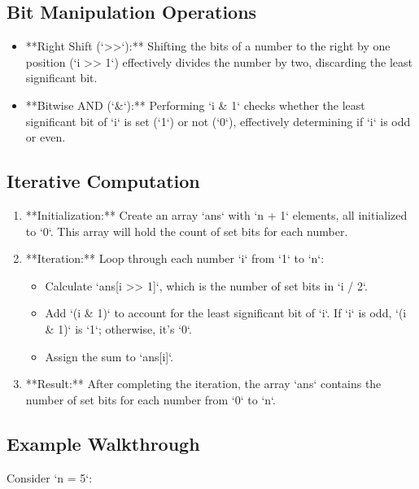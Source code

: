 \subsection*{Bit Manipulation Operations}

\begin{itemize}
    \item **Right Shift (`>>`):** Shifting the bits of a number to the right by one position (`i >> 1`) effectively divides the number by two, discarding the least significant bit.
    
    \item **Bitwise AND (`\&`):** Performing `i \& 1` checks whether the least significant bit of `i` is set (`1`) or not (`0`), effectively determining if `i` is odd or even.
\end{itemize}

\subsection*{Iterative Computation}

\begin{enumerate}
    \item **Initialization:** Create an array `ans` with `n + 1` elements, all initialized to `0`. This array will hold the count of set bits for each number.
    
    \item **Iteration:** Loop through each number `i` from `1` to `n`:
    \begin{itemize}
        \item Calculate `ans[i >> 1]`, which is the number of set bits in `i / 2`.
        \item Add `(i \& 1)` to account for the least significant bit of `i`. If `i` is odd, `(i \& 1)` is `1`; otherwise, it's `0`.
        \item Assign the sum to `ans[i]`.
    \end{itemize}
    
    \item **Result:** After completing the iteration, the array `ans` contains the number of set bits for each number from `0` to `n`.
\end{enumerate}

\subsection*{Example Walkthrough}

Consider `n = 5`:

